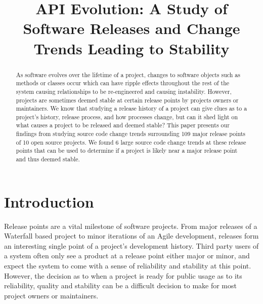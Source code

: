 \documentclass[conference]{IEEEtran}
\begin{document}
\title{API Evolution: A Study of Software Releases and Change Trends Leading to Stability}

\author{
\and
{}
\and
{}
}

\maketitle

\begin{abstract}
As software evolves over the lifetime of a project, changes to software objects such as methods or classes occur which can have ripple effects throughout
the rest of the system causing relationships to be re-engineered and causing instability. However, projects are sometimes deemed stable at certain release
points by projects owners or maintainers. We know that studying a release history of a project can give clues as to a project's history, release process,
and how processes change, but can it shed light on what causes a project to be released and deemed stable? This paper presents our findings from studying
source code change trends surrounding 109 major release points of 10 open source projects. We found 6 large source code change trends at these release
points that can be used to determine if a project is likely near a major release point and thus deemed stable. 
\end{abstract}

\section{Introduction}
Release points are a vital milestone of software projects. From major releases of a Waterfall based project to minor iterations of an Agile development,
releases form an interesting single point of a project's development history.
Third party users of a system often only see a product at a release point either major or minor,
and expect the system to come with a sense of reliability and stability at this point. However, the decision as to when a project is ready for public usage
as to its reliability, quality and stability can be a difficult decision to make for most project owners or maintainers.
\end{document}
